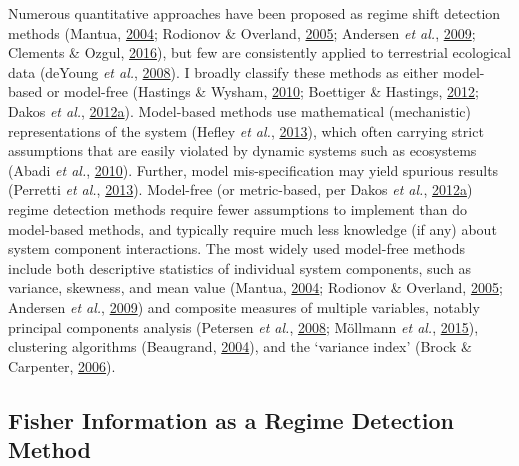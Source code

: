 \documentclass[print]{nuthesis}
\begin{document}
Numerous quantitative approaches have been proposed as regime shift detection methods (Mantua, \protect\hyperlink{ref-mantua_methods_2004}{2004}; Rodionov \& Overland, \protect\hyperlink{ref-rodionov_application_2005}{2005}; Andersen \emph{et al.}, \protect\hyperlink{ref-andersen_ecological_2009}{2009}; Clements \& Ozgul, \protect\hyperlink{ref-clements_including_2016}{2016}), but few are consistently applied to terrestrial ecological data (deYoung \emph{et al.}, \protect\hyperlink{ref-deyoung_regime_2008}{2008}). I broadly classify these methods as either model-based or model-free (Hastings \& Wysham, \protect\hyperlink{ref-hastings2010regime}{2010}; Boettiger \& Hastings, \protect\hyperlink{ref-boettiger_quantifying_2012}{2012}; Dakos \emph{et al.}, \protect\hyperlink{ref-dakos2012methods}{2012}\protect\hyperlink{ref-dakos2012methods}{a}). Model-based methods use mathematical (mechanistic) representations of the system (Hefley \emph{et al.}, \protect\hyperlink{ref-hefley2013statistical}{2013}), which often carrying strict assumptions that are easily violated by dynamic systems such as ecosystems (Abadi \emph{et al.}, \protect\hyperlink{ref-abadi2010assessment}{2010}). Further, model mis-specification may yield spurious results (Perretti \emph{et al.}, \protect\hyperlink{ref-perretti_model-free_2013}{2013}). Model-free (or metric-based, per Dakos \emph{et al.}, \protect\hyperlink{ref-dakos2012methods}{2012}\protect\hyperlink{ref-dakos2012methods}{a}) regime detection methods require fewer assumptions to implement than do model-based methods, and typically require much less knowledge (if any) about system component interactions. The most widely used model-free methods include both descriptive statistics of individual system components, such as variance, skewness, and mean value (Mantua, \protect\hyperlink{ref-mantua_methods_2004}{2004}; Rodionov \& Overland, \protect\hyperlink{ref-rodionov_application_2005}{2005}; Andersen \emph{et al.}, \protect\hyperlink{ref-andersen_ecological_2009}{2009}) and composite measures of multiple variables, notably principal components analysis (Petersen \emph{et al.}, \protect\hyperlink{ref-petersen2008regime}{2008}; Möllmann \emph{et al.}, \protect\hyperlink{ref-mollmann2015marine}{2015}), clustering algorithms (Beaugrand, \protect\hyperlink{ref-beaugrand2004north}{2004}), and the `variance index' (Brock \& Carpenter, \protect\hyperlink{ref-brock_variance_2006}{2006}).

\hypertarget{fisher-information-as-a-regime-detection-method}{%
\subsection{Fisher Information as a Regime Detection Method}\label{fisher-information-as-a-regime-detection-method}}
\end{document}
